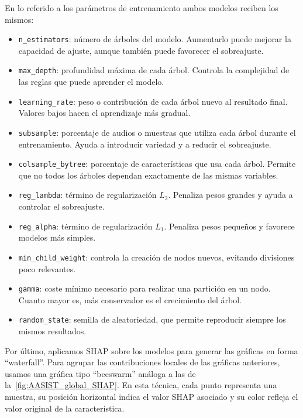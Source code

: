 En lo referido a los parámetros de entrenamiento ambos modelos reciben los mismos:
\begin{itemize}
    \item \texttt{n\_estimators}: número de árboles del modelo. Aumentarlo puede mejorar la capacidad de ajuste, aunque también puede favorecer el sobreajuste.
    \item \texttt{max\_depth}: profundidad máxima de cada árbol. Controla la complejidad de las reglas que puede aprender el modelo.
    \item \texttt{learning\_rate}: peso o contribución de cada árbol nuevo al resultado final. Valores bajos hacen el aprendizaje más gradual.
    \item \texttt{subsample}: porcentaje de audios o muestras que utiliza cada árbol durante el entrenamiento. Ayuda a introducir variedad y a reducir el sobreajuste.
    \item \texttt{colsample\_bytree}: porcentaje de características que usa cada árbol. Permite que no todos los árboles dependan exactamente de las mismas variables.
    \item \texttt{reg\_lambda}: término de regularización \(L_2\). Penaliza pesos grandes y ayuda a controlar el sobreajuste.
    \item \texttt{reg\_alpha}: término de regularización \(L_1\). Penaliza pesos pequeños y favorece modelos más simples.
    \item \texttt{min\_child\_weight}: controla la creación de nodos nuevos, evitando divisiones poco relevantes.
    \item \texttt{gamma}: coste mínimo necesario para realizar una partición en un nodo. Cuanto mayor es, más conservador es el crecimiento del árbol.
    \item \texttt{random\_state}: semilla de aleatoriedad, que permite reproducir siempre los mismos resultados.
\end{itemize}

Por último, aplicamos SHAP sobre los modelos para generar las gráficas en forma ``waterfall''. Para agrupar las contribuciones locales de las gráficas anteriores, usamos una gráfica tipo ``beeswarm'' análoga a las de la~\autoref{fig:AASIST_global_SHAP}. En esta técnica, cada punto representa una muestra, su posición horizontal indica el valor SHAP asociado y su color refleja el valor original de la característica.